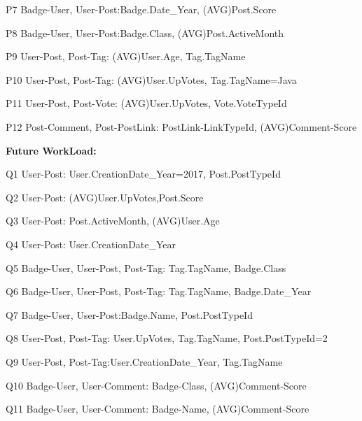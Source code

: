 P7 \hspace{3mm} Badge-User, User-Post:Badge.Date\_Year, (AVG)Post.Score

P8 \hspace{3mm} Badge-User, User-Post:Badge.Class, (AVG)Post.ActiveMonth

P9 \hspace{3mm} User-Post, Post-Tag: (AVG)User.Age, Tag.TagName

P10 \hspace{1.3mm} User-Post, Post-Tag: (AVG)User.UpVotes, Tag.TagName=Java

P11 \hspace{1.3mm} User-Post, Post-Vote: (AVG)User.UpVotes, Vote.VoteTypeId

P12 \hspace{1.3mm} Post-Comment, Post-PostLink: PostLink-LinkTypeId, (AVG)Comment-Score


\par
\textbf{Future WorkLoad:}

Q1 \hspace{3mm} User-Post: User.CreationDate\_Year=2017, Post.PostTypeId

Q2 \hspace{3mm} User-Post: (AVG)User.UpVotes,Post.Score

Q3 \hspace{3mm} User-Post: Post.ActiveMonth, (AVG)User.Age

Q4 \hspace{3mm} User-Post: User.CreationDate\_Year

Q5 \hspace{3mm} Badge-User, User-Post, Post-Tag: Tag.TagName, Badge.Class

Q6 \hspace{3mm} Badge-User, User-Post, Post-Tag: Tag.TagName, Badge.Date\_Year

Q7 \hspace{3mm} Badge-User, User-Post:Badge.Name, Post.PostTypeId

Q8 \hspace{3mm} User-Post, Post-Tag: User.UpVotes, Tag.TagName, Post.PostTypeId=2

Q9 \hspace{3mm} User-Post, Post-Tag:User.CreationDate\_Year, Tag.TagName

Q10 \hspace{1.3mm} Badge-User, User-Comment: Badge-Class, (AVG)Comment-Score

Q11 \hspace{1.3mm} Badge-User, User-Comment: Badge-Name, (AVG)Comment-Score

